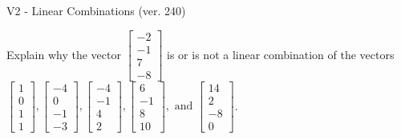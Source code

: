 \begin{exercise}
  \begin{exerciseTitle}V2 - Linear Combinations (ver. 240)\end{exerciseTitle}
  \begin{exerciseStatement}
    Explain why the vector \(\left[\begin{array}{c}
-2 \\
-1 \\
7 \\
-8
\end{array}\right]\)  is or is not a linear 
	combination of the vectors \(\left[\begin{array}{c}
1 \\
0 \\
1 \\
1
\end{array}\right] , \left[\begin{array}{c}
-4 \\
0 \\
-1 \\
-3
\end{array}\right] , \left[\begin{array}{c}
-4 \\
-1 \\
4 \\
2
\end{array}\right] , \left[\begin{array}{c}
6 \\
-1 \\
8 \\
10
\end{array}\right] , \text{ and } \left[\begin{array}{c}
14 \\
2 \\
-8 \\
0
\end{array}\right]\).
	



\end{exerciseStatement}
\end{exercise}
